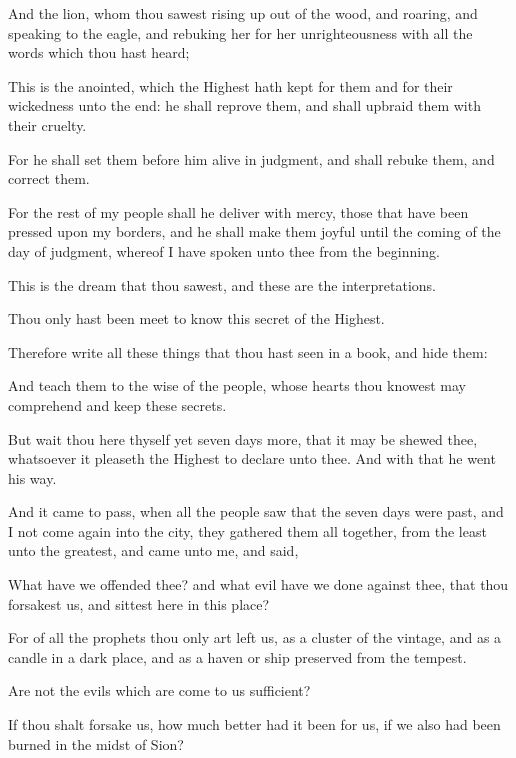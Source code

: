 {\par }{\PP {}And the lion, whom thou sawest rising up out of the wood, and roaring, and speaking to the eagle, and rebuking her for her unrighteousness with all the words which thou hast heard;
\par }{\PP {}This is the anointed, which the Highest hath kept for them and for their wickedness unto the end: he shall reprove them, and shall upbraid them with their cruelty.
\par }{\PP {}For he shall set them before him alive in judgment, and shall rebuke them, and correct them.
\par }{\PP {}For the rest of my people shall he deliver with mercy, those that have been pressed upon my borders, and he shall make them joyful until the coming of the day of judgment, whereof I have spoken unto thee from the beginning.
\par }{\PP {}This is the dream that thou sawest, and these are the interpretations.
\par }{\PP {}Thou only hast been meet to know this secret of the Highest.
\par }{\PP {}Therefore write all these things that thou hast seen in a book, and hide them:
\par }{\PP {}And teach them to the wise of the people, whose hearts thou knowest may comprehend and keep these secrets.
\par }{\PP {}But wait thou here thyself yet seven days more, that it may be shewed thee, whatsoever it pleaseth the Highest to declare unto thee. And with that he went his way.
\par }{\PP {}And it came to pass, when all the people saw that the seven days were past, and I not come again into the city, they gathered them all together, from the least unto the greatest, and came unto me, and said,
\par }{\PP {}What have we offended thee? and what evil have we done against thee, that thou forsakest us, and sittest here in this place?
\par }{\PP {}For of all the prophets thou only art left us, as a cluster of the vintage, and as a candle in a dark place, and as a haven or ship preserved from the tempest.
\par }{\PP {}Are not the evils which are come to us sufficient?
\par }{\PP {}If thou shalt forsake us, how much better had it been for us, if we also had been burned in the midst of Sion?
}

